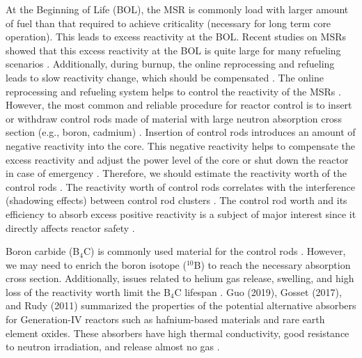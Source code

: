 At the Beginning of Life (BOL), the MSR is commonly load with larger amount of 
fuel than that required to achieve criticality (necessary for long term core 
operation). This leads to excess reactivity at the BOL. Recent studies on MSRs showed that this excess reactivity 
at the BOL is quite large for many refueling scenarios 
\cite{ashraf2020Strategies,ashraf2019whole_core,rykhlevskii2019modeling,betzler2016modeling,ashraf2018nuclear,ashraf2019modeling}.
Additionally, during burnup, the online 
reprocessing and refueling leads to slow reactivity change, which 
should be compensated \cite{ashraf2020Strategies,ashraf2019whole_core}. 
The online reprocessing and refueling system helps to control the reactivity of 
the MSRs \cite{ashraf2019whole_core}. However, the most common and reliable procedure 
for reactor control is to insert or withdraw control rods made of material 
with large neutron absorption cross section (e.g., boron, cadmium) 
\cite{duderstadt650nuclear}. 
Insertion of control rods introduces an amount of negative reactivity into the 
core. This negative reactivity helps to compensate the excess reactivity and 
adjust the power level of the core or shut down the reactor in case of  
emergency \cite{glasstone1967nuclear}. Therefore, we should estimate 
the reactivity worth of the control rods 
\cite{varvayanni2009estimation,fadaei2009control,aoyama2007core,bretscher1997computing}.
 The reactivity worth of control rods correlates with the interference 
(shadowing effects) between control rod clusters 
\cite{girardin2008development,vcerba2017optimization}. 
The control rod worth and its efficiency to absorb excess positive reactivity is a subject of major interest since it directly affects reactor safety \cite{liu2018criticality,atkinson2019small,vcerba2017optimization,do2019criticality,guo2019advanced,varvayanni2009estimation}.

Boron carbide (B$_4$C) is commonly used material for the control rods 
\cite{zhong2019preliminary,steinbruck2010degradation,dunner1984absorber}. 
However, we may need to enrich the boron isotope ($^{10}$B) to reach 
the necessary absorption cross section. Additionally, issues related to helium gas release, swelling,
and high loss of the reactivity worth limit the B$_4$C lifespan 
\cite{guo2019optimized}. Guo (2019), Gosset (2017), and Rudy (2011) summarized the properties of the 
potential alternative absorbers for Generation-IV reactors such as 
hafnium-based materials and rare earth element oxides. These absorbers have 
high thermal conductivity, good resistance to neutron irradiation, and release 
almost no gas 
\cite{guo2019optimized,gosset2017absorber,konings2011comprehensive}.

